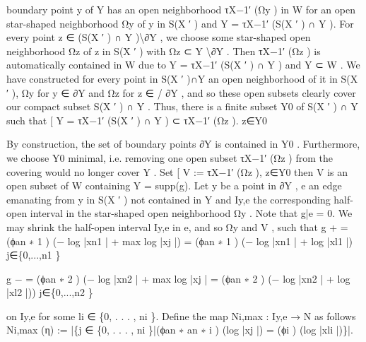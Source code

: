 \documentclass[
  10pt,
]{article}
\newenvironment{Shaded}{}{}
\newcommand{\NormalTok}[1]{#1}
\begin{document}
\begin{Shaded}
\begin{Highlighting}[]
\NormalTok{boundary point y of Y has an open neighborhood τX−1′ (Ωy ) in W for an open star{-}shaped}
\NormalTok{neighborhood Ωy of y in S(X ′ ) and Y = τX−1′ (S(X ′ ) ∩ Y ).}
\NormalTok{   For every point z ∈ (S(X ′ ) ∩ Y )\textbackslash{}∂Y , we choose some star{-}shaped open neighborhood}
\NormalTok{Ωz of z in S(X ′ ) with Ωz ⊂ Y \textbackslash{}∂Y . Then τX−1′ (Ωz ) is automatically contained in W due}
\NormalTok{to Y = τX−1′ (S(X ′ ) ∩ Y ) and Y ⊂ W .}
\NormalTok{   We have constructed for every point in S(X ′ )∩Y an open neighborhood of it in S(X ′ ),}
\NormalTok{Ωy for y ∈ ∂Y and Ωz for z ∈    / ∂Y , and so these open subsets clearly cover our compact}
\NormalTok{subset S(X ′ ) ∩ Y . Thus, there is a finite subset Y0 of S(X ′ ) ∩ Y such that}
\NormalTok{                                                        [}
\NormalTok{                             Y = τX−1′ (S(X ′ ) ∩ Y ) ⊂   τX−1′ (Ωz ).}
\NormalTok{                                                               z∈Y0}

\NormalTok{By construction, the set of boundary points ∂Y is contained in Y0 . Furthermore, we}
\NormalTok{choose Y0 minimal, i.e. removing one open subset τX−1′ (Ωz ) from the covering would no}
\NormalTok{longer cover Y . Set}
\NormalTok{                                       [}
\NormalTok{                                 V :=      τX−1′ (Ωz ),}
\NormalTok{                                                 z∈Y0}
\NormalTok{then V is an open subset of W containing Y = supp(g).}
\NormalTok{   Let y be a point in ∂Y , e an edge emanating from y in S(X ′ ) not contained in Y and}
\NormalTok{Iy,e the corresponding half{-}open interval in the star{-}shaped open neighborhood Ωy . Note}
\NormalTok{that g|e = 0. We may shrink the half{-}open interval Iy,e in e, and so Ωy and V , such that}
\NormalTok{        g + = (ϕan ∗}
\NormalTok{                1 ) (− log |xn1 | +       max          log |xj |) = (ϕan ∗}
\NormalTok{                                                                      1 ) (− log |xn1 | + log |xl1 |)}
\NormalTok{                                       j∈\{0,...,n1 \}}

\NormalTok{        g − = (ϕan ∗}
\NormalTok{                2 ) (− log |xn2 | +       max          log |xj | = (ϕan ∗}
\NormalTok{                                                                     2 ) (− log |xn2 | + log |xl2 |))}
\NormalTok{                                       j∈\{0,...,n2 \}}

\NormalTok{on Iy,e for some li ∈ \{0, . . . , ni \}. Define the map Ni,max : Iy,e → N as follows}
\NormalTok{            Ni,max (η) := |\{j ∈ \{0, . . . , ni \}|(ϕan ∗                an ∗}
\NormalTok{                                                   i ) (log |xj |) = (ϕi ) (log |xli |)\}|.}


\end{Highlighting}
\end{Shaded}
\end{document}
